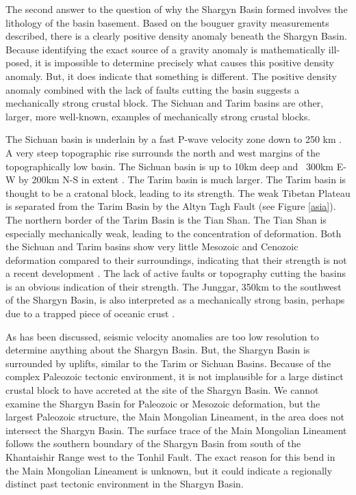	The second answer to the question of why the Shargyn Basin formed involves the lithology of the basin basement. Based on the bouguer gravity measurements described, there is a clearly positive density anomaly beneath the Shargyn Basin. Because identifying the exact source of a gravity anomaly is mathematically ill-posed, it is impossible to determine precisely what causes this positive density anomaly. But, it does indicate that something is different. The positive density anomaly combined with the lack of faults cutting the basin suggests a mechanically strong crustal block. The Sichuan and Tarim basins are other, larger, more well-known, examples of mechanically strong crustal blocks. 
	
	The Sichuan basin is underlain by a fast P-wave velocity zone down to 250 km \citep{Royden2008}. A very steep topographic rise surrounds the north and west margins of the topographically low basin. The Sichuan basin is up to 10km deep and ~300km E-W by 200km N-S in extent \citep{Burchfiel2008}. The Tarim basin is much larger. The Tarim basin is thought to be a cratonal block, leading to its strength. The weak Tibetan Plateau is separated from the Tarim Basin by the Altyn Tagh Fault (see Figure \ref{asia}). The northern border of the Tarim Basin is the Tian Shan. The Tian Shan is especially mechanically weak, leading to the concentration of deformation. Both the Sichuan and Tarim basins show very little Mesozoic and Cenozoic deformation compared to their surroundings, indicating that their strength is not a recent development \citep{Neil1997}. The lack of active faults or topography cutting the basins is an obvious indication of their strength. The Junggar, 350km to the southwest of the Shargyn Basin, is also interpreted as a mechanically strong basin, perhaps due to a trapped piece of oceanic crust \citep{Carroll1990a}. 

	As has been discussed, seismic velocity anomalies are too low resolution to determine anything about the Shargyn Basin. But, the Shargyn Basin is surrounded by uplifts, similar to the Tarim or Sichuan Basins. Because of the complex Paleozoic tectonic environment, it is not implausible for a large distinct crustal block to have accreted at the site of the Shargyn Basin. We cannot examine the Shargyn Basin for Paleozoic or Mesozoic deformation, but the largest Paleozoic structure, the Main Mongolian Lineament, in the area does not intersect the Shargyn Basin. The surface trace of the Main Mongolian Lineament follows the southern boundary of the Shargyn Basin from south of the Khantaishir Range west to the Tonhil Fault. The exact reason for this bend in the Main Mongolian Lineament is unknown, but it could indicate a regionally distinct past tectonic environment in the Shargyn Basin.

